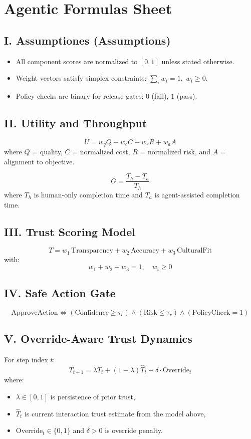 \section*{Agentic Formulas Sheet}

\subsection*{I. Assumptiones (Assumptions)}
\begin{itemize}
  \item All component scores are normalized to $[0,1]$ unless stated otherwise.
  \item Weight vectors satisfy simplex constraints: $\sum_i w_i = 1,\; w_i \ge 0$.
  \item Policy checks are binary for release gates: $0$ (fail), $1$ (pass).
\end{itemize}

\subsection*{II. Utility and Throughput}
\[
U = w_qQ - w_cC - w_rR + w_aA
\]
where $Q$ = quality, $C$ = normalized cost, $R$ = normalized risk, and $A$ = alignment to objective.

\[
G = \frac{T_h-T_a}{T_h}
\]
where $T_h$ is human-only completion time and $T_a$ is agent-assisted completion time.

\subsection*{III. Trust Scoring Model}
\[
T = w_1\,\text{Transparency}+w_2\,\text{Accuracy}+w_3\,\text{CulturalFit}
\]
with:
\[
w_1+w_2+w_3=1,\quad w_i\ge 0
\]

\subsection*{IV. Safe Action Gate}
\[
\text{ApproveAction}\iff (\text{Confidence}\ge\tau_c)\land(\text{Risk}\le\tau_r)\land(\text{PolicyCheck}=1)
\]

\subsection*{V. Override-Aware Trust Dynamics}
For step index $t$:
\[
T_{t+1} = \lambda T_t + (1-\lambda)\hat{T}_{t} - \delta \cdot \text{Override}_t
\]
where:
\begin{itemize}
  \item $\lambda \in [0,1]$ is persistence of prior trust,
  \item $\hat{T}_t$ is current interaction trust estimate from the model above,
  \item $\text{Override}_t \in \{0,1\}$ and $\delta > 0$ is override penalty.
\end{itemize}

